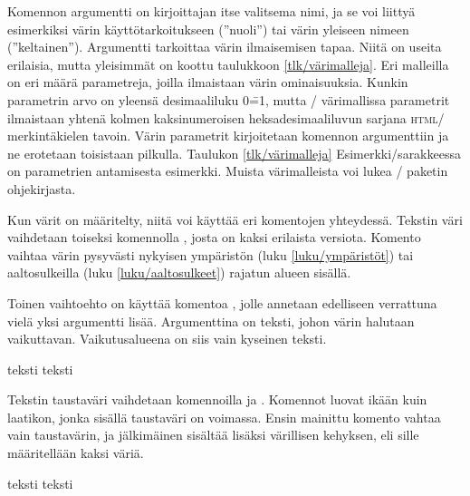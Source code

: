 \noindent
Komennon argumentti  on kirjoittajan itse valitsema nimi,
ja se voi liittyä esimerkiksi värin käyttötarkoitukseen (''nuoli'') tai
värin yleiseen nimeen (''keltainen''). Argumentti 
tarkoittaa värin ilmaisemisen tapaa. Niitä on useita erilaisia, mutta
yleisimmät on koottu taulukkoon \ref{tlk/värimalleja}. Eri malleilla on
eri määrä parametreja, joilla ilmaistaan värin ominaisuuksia. Kunkin
parametrin arvo on yleensä desimaaliluku 0\==1, mutta \-/
värimallissa parametrit ilmaistaan yhtenä kolmen kaksinumeroisen
heksadesimaaliluvun sarjana \textsc{html}\-/ merkintäkielen tavoin.
Värin parametrit kirjoitetaan komennon argumenttiin
 ja ne erotetaan toisistaan pilkulla. Taulukon
\ref{tlk/värimalleja} Esimerkki\-/sarakkeessa on parametrien antamisesta
esimerkki. Muista värimalleista voi lukea \-/ paketin
ohjekirjasta.

Kun värit on määritelty, niitä voi käyttää eri komentojen yhteydessä.
Tekstin väri vaihdetaan toiseksi komennolla , josta on
kaksi erilaista versiota. Komento vaihtaa värin pysyvästi nykyisen
ympäristön (luku \ref{luku/ympäristöt}) tai aaltosulkeilla (luku
\ref{luku/aaltosulkeet}) rajatun alueen sisällä.

\begin{koodilohkosis}
\color{nimi}                  %
\color[värimalli]{parametrit} %
\end{koodilohkosis}

\noindent
Toinen vaihtoehto on käyttää komentoa , jolle
annetaan edelliseen verrattuna vielä yksi argumentti lisää. Argumenttina
on teksti, johon värin halutaan vaikuttavan. Vaikutusalueena on siis
vain kyseinen teksti.

\begin{koodilohkosis}
\textcolor{nimi}{teksti}
\textcolor[värimalli]{parametrit}{teksti}
\end{koodilohkosis}

\noindent
Tekstin taustaväri vaihdetaan komennoilla  ja
. Komennot luovat ikään kuin laatikon, jonka sisällä
taustaväri on voimassa. Ensin mainittu komento vahtaa vain taustavärin,
ja jälkimäinen sisältää lisäksi värillisen kehyksen, eli sille
määritellään kaksi väriä.

\begin{koodilohkosis}
\colorbox{nimi}{teksti} %
\colorbox[värimalli]{parametrit}{teksti}
\end{koodilohkosis}

